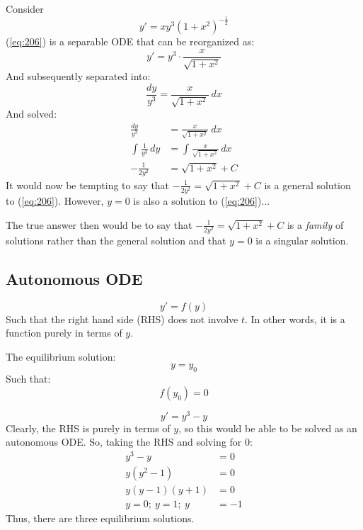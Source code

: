 \documentclass[12pt]{article}
\begin{document}
Consider
\begin{equation}
  y' = xy^3\left(1+x^2\right)^{-\frac{1}{2}}
  \label{eq:206}
\end{equation}
(\ref{eq:206}) is a separable ODE that can be reorganized as:
\begin{equation*}
  y' = y^3 \cdot \frac{x}{\sqrt{1+x^2}}
\end{equation*}
And subsequently separated into:
\begin{equation*}
  \frac{dy}{y^3} = \frac{x}{\sqrt{1+x^2}}\ dx
\end{equation*}
And solved:
\begin{align*}
  \frac{dy}{y^3} &= \frac{x}{\sqrt{1+x^2}}\ dx \\
  \int_{}^{} \frac{1}{y^3} \, dy &= \int_{}^{} \frac{x}{\sqrt{1+x^2}}\,dx \\
  -\frac{1}{2y^2} &= \sqrt{1+x^2} + C
\end{align*}
It would now be tempting to say that $-\frac{1}{2y^2} = \sqrt{1+x^2} + C$ is a general solution to (\ref{eq:206}). However, $y=0$ is also a solution to (\ref{eq:206})$\hdots$

The true answer then would be to say that $-\frac{1}{2y^2} = \sqrt{1+x^2} + C$ is a \textit{family} of solutions rather than the general solution and that $y=0$ is a singular solution.

\subsection{Autonomous ODE}
\label{ssec:autonomousODE}

\begin{equation*}
  y' = f(y)
\end{equation*}
Such that the right hand side (RHS) does not involve $t$. In other words, it is a function purely in terms of $y$.

The equilibrium solution:
\begin{equation*}
  y = y_0
\end{equation*}
Such that:
\begin{equation*}
  f(y_0) = 0
\end{equation*}
\begin{example}
  \begin{equation*}
    y' = y^3 - y
  \end{equation*}
  Clearly, the RHS is purely in terms of $y$, so this would be able to be solved as an autonomous ODE. So, taking the RHS and solving for $0$:
  \begin{align*}
    y^3 - y &= 0 \\
    y\left(y^2 - 1\right) &= 0 \\
    y\left(y - 1\right)\left(y + 1\right) &= 0 \\
    y = 0;\ y = 1;\ y &= -1
  \end{align*}
  Thus, there are three equilibrium solutions.
\end{example}
\end{document}

